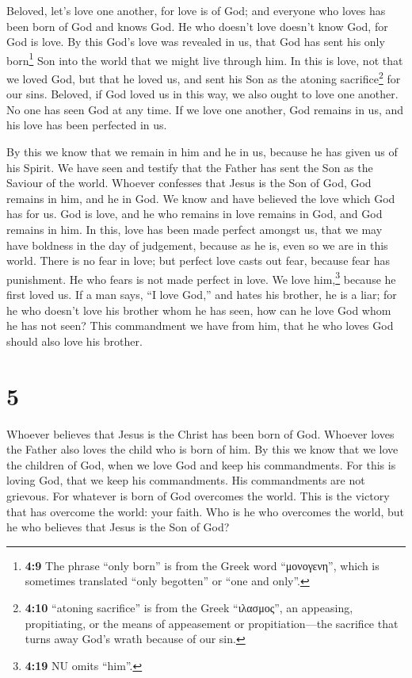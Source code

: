  Beloved, let's love one another, for love is of God; and
everyone who loves has been born of God and knows God.  He
who doesn't love doesn't know God, for God is love.  By
this God's love was revealed in us, that God has sent his only
born\footnote{\textbf{4:9} The phrase ``only born'' is from the Greek
  word ``μονογενη'', which is sometimes translated ``only begotten'' or
  ``one and only''.} Son into the world that we might live through him.
 In this is love, not that we loved God, but that he
loved us, and sent his Son as the atoning sacrifice\footnote{\textbf{4:10}
  ``atoning sacrifice'' is from the Greek ``ιλασμος'', an appeasing,
  propitiating, or the means of appeasement or propitiation---the
  sacrifice that turns away God's wrath because of our sin.} for our
sins.  Beloved, if God loved us in this way, we also
ought to love one another.  No one has seen God at any
time. If we love one another, God remains in us, and his love has been
perfected in us.

 By this we know that we remain in him and he in us,
because he has given us of his Spirit.  We have seen and
testify that the Father has sent the Son as the Saviour of the world.
 Whoever confesses that Jesus is the Son of God, God
remains in him, and he in God.  We know and have believed
the love which God has for us. God is love, and he who remains in love
remains in God, and God remains in him.  In this, love
has been made perfect amongst us, that we may have boldness in the day
of judgement, because as he is, even so we are in this world.
 There is no fear in love; but perfect love casts out
fear, because fear has punishment. He who fears is not made perfect in
love.  We love him,\footnote{\textbf{4:19} NU omits
  ``him''.} because he first loved us.  If a man says,
``I love God,'' and hates his brother, he is a liar; for he who doesn't
love his brother whom he has seen, how can he love God whom he has not
seen?  This commandment we have from him, that he who
loves God should also love his brother.

\hypertarget{section-4}{%
\section{5}\label{section-4}}

 Whoever believes that Jesus is the Christ has been born
of God. Whoever loves the Father also loves the child who is born of
him.  By this we know that we love the children of God,
when we love God and keep his commandments.  For this is
loving God, that we keep his commandments. His commandments are not
grievous.  For whatever is born of God overcomes the
world. This is the victory that has overcome the world: your faith.
 Who is he who overcomes the world, but he who believes
that Jesus is the Son of God?

